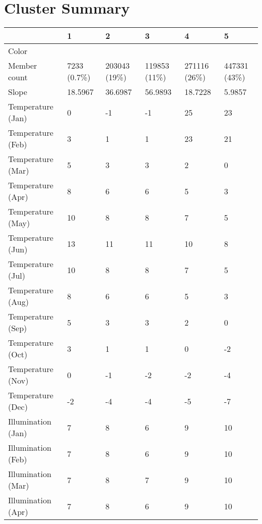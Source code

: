\chapter{Cluster Summary} \label{AppendixA}

\begin{longtable}{|p{4cm}|p{2cm}|p{2cm}|p{2cm}|p{2cm}|p{2cm}|}
		\hline	
  	     & \textbf{1} &  \textbf{2} & \textbf{3} & \textbf{4} & \textbf{5} \\
		\hline
  	    Color & \cellcolor{cluster_1} & \cellcolor{cluster_2} & \cellcolor{cluster_3} & \cellcolor{cluster_4} & \cellcolor{cluster_5} \\
		\hline
  	    Member count & 7233 (0.7\%)  & 203043 (19\%) & 119853 (11\%)  & 271116 (26\%) & 447331 (43\%) \\
		\hline
  	    Slope & 18.5967 & 36.6987 & 56.9893 & 18.7228 & 5.9857 \\
		\hline
  	    Temperature (Jan) & 0 & -1 & -1 & 25 & 23 \\
		\hline
  	    Temperature (Feb) & 3 & 1 & 1 & 23 & 21 \\
		\hline
  	    Temperature (Mar) & 5 & 3 & 3 & 2 & 0 \\
		\hline
  	    Temperature (Apr) & 8 & 6 & 6 & 5 & 3 \\
		\hline
  	    Temperature (May) & 10 & 8 & 8 & 7 & 5 \\
		\hline
		Temperature (Jun) & 13 & 11 & 11 & 10 & 8 \\
		\hline
		Temperature (Jul) & 10 & 8 & 8 & 7 & 5 \\
		\hline
		Temperature (Aug) & 8 & 6 & 6 & 5 & 3 \\
		\hline
		Temperature (Sep) & 5 & 3 & 3 & 2 & 0 \\
		\hline
		Temperature (Oct) & 3 & 1 & 1 & 0 & -2 \\
		\hline
		Temperature (Nov) & 0 & -1 & -2 & -2 & -4 \\
		\hline
		Temperature (Dec) & -2 & -4 & -4 & -5 & -7 \\
		\hline
  	    Illumination (Jan) & 7 & 8 & 6 & 9 & 10 \\
		\hline
  	    Illumination (Feb) & 7 & 8 & 6 & 9 & 10 \\
		\hline
  	    Illumination (Mar) & 7 & 8 & 7 & 9 & 10 \\
		\hline
  	    Illumination (Apr) & 7 & 8 & 6 & 9 & 10 \\

\end{longtable}
